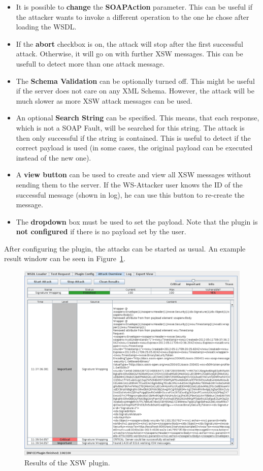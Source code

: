 \begin{itemize}
    \item It is possible to \textbf{change} the \textbf{SOAPAction} parameter. This can be useful if the attacker wants to invoke a different operation to the one he chose after loading the WSDL.
    \item If the \textbf{abort} checkbox is on, the attack will stop after the first successful attack. Otherwise, it will go on with further XSW messages. This can be usefull to detect more than one attack message.
    \item The \textbf{Schema Validation} can be optionally turned off. This might be useful if the server does not care on any XML Schema. However, the attack will be much slower as more XSW attack messages can be used.
    \item An optional \textbf{Search String} can be specified. This means, that each response, which is not a SOAP Fault, will be searched for this string. The attack is then only successful if the string is contained. This is useful to detect if the correct payload is used (in some cases, the original payload can be executed instead of the new one).
    \item A \textbf{view button} can be used to create and view all XSW messages without sending them to the server. If the WS-Attacker user knows the ID of the successful message (shown in log), he can use this button to re-create the message.
    \item The \textbf{dropdown} box must be used to set the payload. Note that the plugin is \textbf{not configured} if there is no payload set by the user.
\end{itemize}

After configuring the plugin, the attacks can be started as usual. An example result
window can be seen in Figure~\ref{fig:xsw_plugin_result}.

\begin{figure}[ht]
    \begin{center}
        \includegraphics[width=0.9\linewidth]{img/xsw_attacking_axis_with_policy_result}
    \end{center}
    \caption{Results of the XSW plugin.}
    \label{fig:xsw_plugin_result}
\end{figure}
